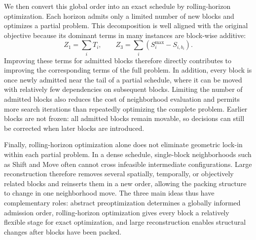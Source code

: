 \documentclass[runningheads]{llncs}
\begin{document}
We then convert this global order into an exact schedule by rolling-horizon
optimization.  Each horizon admits only a limited number of new blocks and
optimizes a partial problem.  This decomposition is well aligned with the
original objective because its dominant terms in many instances are
block-wise additive:
\begin{equation}
Z_1=\sum_i T_i, \qquad
Z_3=\sum_i \left(S_i^{\max}-S_{i,b_i}\right).
\end{equation}
Improving these terms for admitted blocks therefore directly contributes to
improving the corresponding terms of the full problem.  In addition, every
block is once newly admitted near the tail of a partial schedule, where it can
be moved with relatively few dependencies on subsequent blocks.  Limiting the
number of admitted blocks also reduces the cost of neighborhood evaluation
and permits more search iterations than repeatedly optimizing the complete
problem.  Earlier blocks are not frozen: all admitted blocks remain movable,
so decisions can still be corrected when later blocks are introduced.

Finally, rolling-horizon optimization alone does not eliminate geometric
lock-in within each partial problem.  In a dense schedule, single-block
neighborhoods such as Shift and Move often cannot cross infeasible
intermediate configurations.  Large reconstruction therefore removes several
spatially, temporally, or objectively related blocks and reinserts them in a
new order, allowing the packing structure to change in one neighborhood move.
The three main ideas thus have complementary roles: abstract preoptimization
determines a globally informed admission order, rolling-horizon optimization
gives every block a relatively flexible stage for exact optimization, and
large reconstruction enables structural changes after blocks have been
packed.
\end{document}
